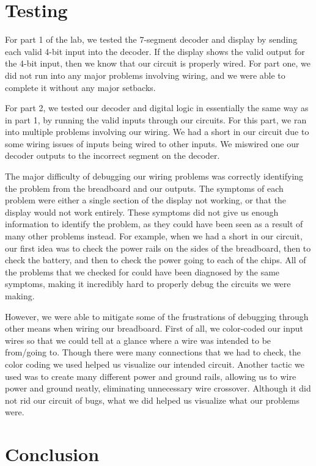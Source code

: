 \documentclass{article}
\begin{document}
\section{Testing}

For part 1 of the lab, we tested the 7-segment decoder and display
by sending each valid 4-bit input into the decoder. If the display
shows the valid output for the 4-bit input, then we know that our
circuit is properly wired. For part one, we did not run into any major
problems involving wiring, and we were able to complete it without any
major setbacks.

For part 2, we tested our decoder and digital logic in essentially the
same way as in part 1, by running the valid inputs through our
circuits. For this part, we ran into multiple problems involving our
wiring. We had a short in our circuit due to some wiring issues of
inputs being wired to other inputs. We miswired one our decoder
outputs to the incorrect segment on the decoder.

The major difficulty of debugging our wiring problems was correctly
identifying the problem from the breadboard and our outputs. The
symptoms of each problem were either a single section of the display
not working, or that the display would not work entirely. These
symptoms did not give us enough information to identify the problem,
as they could have been seen as a result of many other problems
instead. For example, when we had a short in our circuit, our first
idea was to check the power rails on the sides of the breadboard, then
to check the battery, and then to check the power going to each of the
chips. All of the problems that we checked for could have been
diagnosed by the same symptoms, making it incredibly hard to properly
debug the circuits we were making.

However, we were able to mitigate some of the frustrations of
debugging through other means when wiring our breadboard. First of
all, we color-coded our input wires so that we could tell at a glance
where a wire was intended to be from/going to. Though there were many
connections that we had to check, the color coding we used helped us
visualize our intended circuit. Another tactic we used was to create
many different power and ground rails, allowing us to wire power and
ground neatly, eliminating unnecessary wire crossover. Although it did
not rid our circuit of bugs, what we did helped us visualize what our
problems were.


\section{Conclusion}
\end{document}
